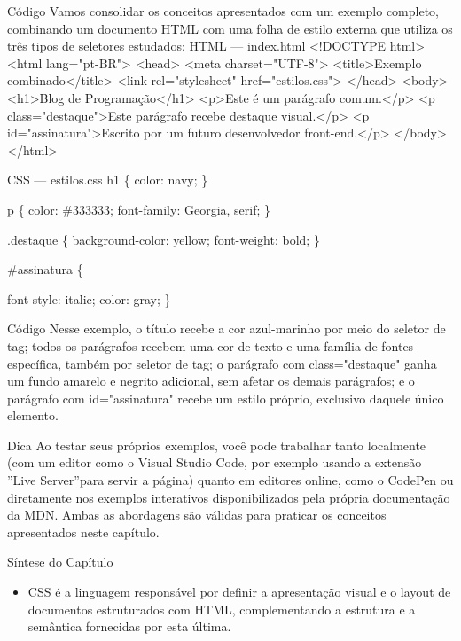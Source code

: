 \begin{codebox}{Código}
Vamos consolidar os conceitos apresentados com um exemplo completo, combinando
um documento HTML com uma folha de estilo externa que utiliza os três tipos de
seletores estudados:
HTML — index.html
<!DOCTYPE html>
<html lang="pt-BR">
<head>
<meta charset="UTF-8">
<title>Exemplo combinado</title>
<link rel="stylesheet" href="estilos.css">
</head>
<body>
<h1>Blog de Programação</h1>
<p>Este é um parágrafo comum.</p>
<p class="destaque">Este parágrafo recebe destaque visual.</p>
<p id="assinatura">Escrito por um futuro desenvolvedor front-end.</p>
</body>
</html>
\end{codebox}

CSS — estilos.css h1 \{ color: navy; \}

p \{ color: \#333333; font-family: Georgia, serif; \}

.destaque \{ background-color: yellow; font-weight: bold; \}

\#assinatura \{

font-style: italic; color: gray; \}

\begin{codebox}{Código}
Nesse exemplo, o título recebe a cor azul-marinho por meio do seletor de tag; todos
os parágrafos recebem uma cor de texto e uma família de fontes específica, também por
seletor de tag; o parágrafo com class="destaque" ganha um fundo amarelo e negrito
adicional, sem afetar os demais parágrafos; e o parágrafo com id="assinatura" recebe
um estilo próprio, exclusivo daquele único elemento.
\end{codebox}

\begin{infobox}{Dica}
Ao testar seus próprios exemplos, você pode trabalhar tanto localmente (com um editor como o Visual Studio Code, por exemplo usando a extensão ”Live Server”para servir a página) quanto em editores online, como o CodePen ou diretamente nos exemplos interativos disponibilizados pela própria documentação da MDN. Ambas as abordagens são válidas para praticar os conceitos apresentados neste capítulo.
\end{infobox}

Síntese do Capítulo

\begin{itemize}
  \item CSS é a linguagem responsável por definir a apresentação visual e o layout de documentos estruturados com HTML, complementando a estrutura e a semântica fornecidas por esta última.
\end{itemize}

